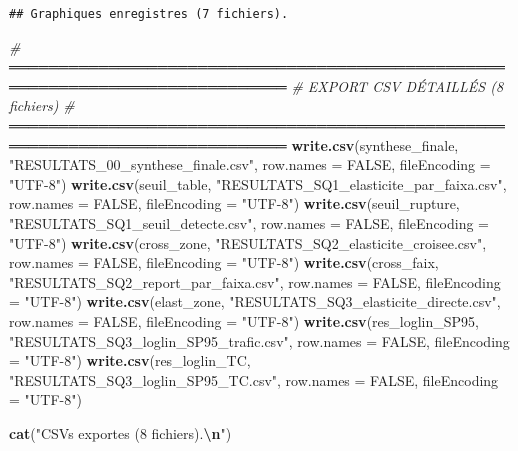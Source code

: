 \documentclass[
]{article}
\newenvironment{Shaded}{\begin{snugshade}}{\end{snugshade}}
\newcommand{\AttributeTok}[1]{\textcolor[rgb]{0.13,0.29,0.53}{#1}}
\newcommand{\CommentTok}[1]{\textcolor[rgb]{0.56,0.35,0.01}{\textit{#1}}}
\newcommand{\ConstantTok}[1]{\textcolor[rgb]{0.56,0.35,0.01}{#1}}
\newcommand{\FunctionTok}[1]{\textcolor[rgb]{0.13,0.29,0.53}{\textbf{#1}}}
\newcommand{\NormalTok}[1]{#1}
\newcommand{\SpecialCharTok}[1]{\textcolor[rgb]{0.81,0.36,0.00}{\textbf{#1}}}
\newcommand{\StringTok}[1]{\textcolor[rgb]{0.31,0.60,0.02}{#1}}
\begin{document}
\begin{verbatim}
## Graphiques enregistres (7 fichiers).
\end{verbatim}

\begin{Shaded}
\begin{Highlighting}[]
\CommentTok{\# ══════════════════════════════════════════════════════════════════════════════}
\CommentTok{\#  EXPORT CSV DÉTAILLÉS (8 fichiers)}
\CommentTok{\# ══════════════════════════════════════════════════════════════════════════════}
\FunctionTok{write.csv}\NormalTok{(synthese\_finale,   }\StringTok{"RESULTATS\_00\_synthese\_finale.csv"}\NormalTok{,         }\AttributeTok{row.names =} \ConstantTok{FALSE}\NormalTok{, }\AttributeTok{fileEncoding =} \StringTok{"UTF{-}8"}\NormalTok{)}
\FunctionTok{write.csv}\NormalTok{(seuil\_table,       }\StringTok{"RESULTATS\_SQ1\_elasticite\_par\_faixa.csv"}\NormalTok{,   }\AttributeTok{row.names =} \ConstantTok{FALSE}\NormalTok{, }\AttributeTok{fileEncoding =} \StringTok{"UTF{-}8"}\NormalTok{)}
\FunctionTok{write.csv}\NormalTok{(seuil\_rupture,     }\StringTok{"RESULTATS\_SQ1\_seuil\_detecte.csv"}\NormalTok{,          }\AttributeTok{row.names =} \ConstantTok{FALSE}\NormalTok{, }\AttributeTok{fileEncoding =} \StringTok{"UTF{-}8"}\NormalTok{)}
\FunctionTok{write.csv}\NormalTok{(cross\_zone,        }\StringTok{"RESULTATS\_SQ2\_elasticite\_croisee.csv"}\NormalTok{,     }\AttributeTok{row.names =} \ConstantTok{FALSE}\NormalTok{, }\AttributeTok{fileEncoding =} \StringTok{"UTF{-}8"}\NormalTok{)}
\FunctionTok{write.csv}\NormalTok{(cross\_faix,        }\StringTok{"RESULTATS\_SQ2\_report\_par\_faixa.csv"}\NormalTok{,       }\AttributeTok{row.names =} \ConstantTok{FALSE}\NormalTok{, }\AttributeTok{fileEncoding =} \StringTok{"UTF{-}8"}\NormalTok{)}
\FunctionTok{write.csv}\NormalTok{(elast\_zone,        }\StringTok{"RESULTATS\_SQ3\_elasticite\_directe.csv"}\NormalTok{,     }\AttributeTok{row.names =} \ConstantTok{FALSE}\NormalTok{, }\AttributeTok{fileEncoding =} \StringTok{"UTF{-}8"}\NormalTok{)}
\FunctionTok{write.csv}\NormalTok{(res\_loglin\_SP95,   }\StringTok{"RESULTATS\_SQ3\_loglin\_SP95\_trafic.csv"}\NormalTok{,     }\AttributeTok{row.names =} \ConstantTok{FALSE}\NormalTok{, }\AttributeTok{fileEncoding =} \StringTok{"UTF{-}8"}\NormalTok{)}
\FunctionTok{write.csv}\NormalTok{(res\_loglin\_TC,     }\StringTok{"RESULTATS\_SQ3\_loglin\_SP95\_TC.csv"}\NormalTok{,         }\AttributeTok{row.names =} \ConstantTok{FALSE}\NormalTok{, }\AttributeTok{fileEncoding =} \StringTok{"UTF{-}8"}\NormalTok{)}
 
\FunctionTok{cat}\NormalTok{(}\StringTok{"CSVs exportes (8 fichiers).}\SpecialCharTok{\textbackslash{}n}\StringTok{"}\NormalTok{)}
\end{Highlighting}
\end{Shaded}
\end{document}
